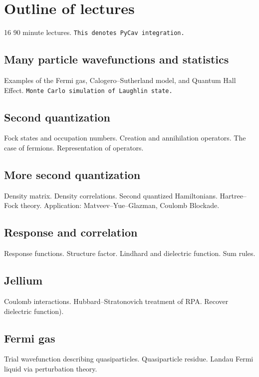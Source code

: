 \section{Outline of lectures}

16 90 minute lectures. \verb|This denotes PyCav integration.|

\subsection{Many particle wavefunctions and statistics}

Examples of the Fermi gas, Calogero--Sutherland model, and Quantum Hall Effect. \verb|Monte Carlo simulation of Laughlin state.|

\subsection{Second quantization}

Fock states and occupation numbers. Creation and annihilation operators. The case of fermions. Representation of operators.

\subsection{More second quantization}

Density matrix. Density correlations. Second quantized Hamiltonians. Hartree--Fock theory. Application: Matveev--Yue--Glazman, Coulomb Blockade.

\subsection{Response and correlation}

Response functions. Structure factor. Lindhard and dielectric function. Sum rules.

\subsection{Jellium}

Coulomb interactions. Hubbard--Stratonovich treatment of RPA. Recover dielectric function).

\subsection{Fermi gas}

Trial wavefunction describing quasiparticles. Quasiparticle residue. Landau Fermi liquid via perturbation theory. 

